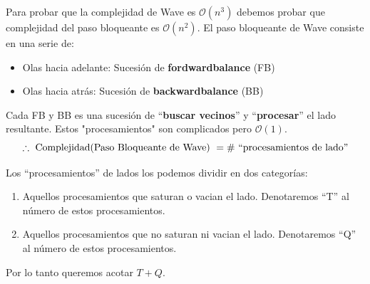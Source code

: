 \documentclass[12pt,a4paper]{report}
\begin{document}
  			\par Para probar que la complejidad de Wave es $\mathcal{O}(n^{3})$ debemos probar que complejidad del paso bloqueante es $\mathcal{O}(n^{2})$. El paso bloqueante de Wave consiste en una serie de:
  			\begin{itemize}
  				\item Olas hacia adelante: Sucesión de \textbf{fordwardbalance} (FB)
  				\item Olas hacia atrás: Sucesión de \textbf{backwardbalance} (BB)
  			\end{itemize}

  			\par Cada FB y BB es una sucesión de \textquotedblleft \textbf{buscar vecinos}\textquotedblright \; y \textquotedblleft \textbf{procesar}\textquotedblright \; el lado resultante. Estos "procesamientos" \; son complicados pero $ \mathcal{O}(1)$.
  			\[ \therefore \textup{ Complejidad(Paso Bloqueante de Wave) } = \# \textup{ \textquotedblleft procesamientos de lado\textquotedblright} \]

  			\par Los \textquotedblleft procesamientos\textquotedblright \; de lados los podemos dividir en dos categorías:
  			\begin{enumerate}
  				\item Aquellos procesamientos que saturan o vacian el lado. Denotaremos \textquotedblleft T\textquotedblright \; al número de estos procesamientos.
  				\item Aquellos procesamientos que no saturan ni vacian el lado. Denotaremos \textquotedblleft Q\textquotedblright \; al número de estos procesamientos.
  			\end{enumerate}
  			\par Por lo tanto queremos acotar $T + Q$.
\end{document}
